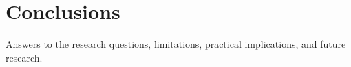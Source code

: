\chapter{Conclusions}

Answers to the research questions, limitations, practical implications, and future research.
